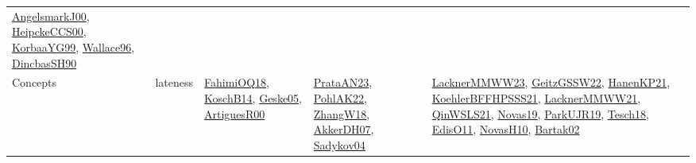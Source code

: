 {\begin{longtable}{lp{3cm}>{\raggedright}p{6cm}>{\raggedright}p{6cm}p{8cm}}
\href{papers/AngelsmarkJ00.pdf}{AngelsmarkJ00}\cite{AngelsmarkJ00}, \href{articles/HeipckeCCS00.pdf}{HeipckeCCS00}\cite{HeipckeCCS00}, \href{papers/KorbaaYG99.pdf}{KorbaaYG99}\cite{KorbaaYG99}, \href{articles/Wallace96.pdf}{Wallace96}\cite{Wallace96}, \href{articles/DincbasSH90.pdf}{DincbasSH90}\cite{DincbasSH90}\\
Concepts & lateness & \href{articles/FahimiOQ18.pdf}{FahimiOQ18}\cite{FahimiOQ18}, \href{papers/KoschB14.pdf}{KoschB14}\cite{KoschB14}, \href{papers/Geske05.pdf}{Geske05}\cite{Geske05}, \href{articles/ArtiguesR00.pdf}{ArtiguesR00}\cite{ArtiguesR00} & \href{articles/PrataAN23.pdf}{PrataAN23}\cite{PrataAN23}, \href{articles/PohlAK22.pdf}{PohlAK22}\cite{PohlAK22}, \href{articles/ZhangW18.pdf}{ZhangW18}\cite{ZhangW18}, \href{papers/AkkerDH07.pdf}{AkkerDH07}\cite{AkkerDH07}, \href{papers/Sadykov04.pdf}{Sadykov04}\cite{Sadykov04} & \href{articles/LacknerMMWW23.pdf}{LacknerMMWW23}\cite{LacknerMMWW23}, \href{papers/GeitzGSSW22.pdf}{GeitzGSSW22}\cite{GeitzGSSW22}, \href{papers/HanenKP21.pdf}{HanenKP21}\cite{HanenKP21}, \href{articles/KoehlerBFFHPSSS21.pdf}{KoehlerBFFHPSSS21}\cite{KoehlerBFFHPSSS21}, \href{papers/LacknerMMWW21.pdf}{LacknerMMWW21}\cite{LacknerMMWW21}, \href{articles/QinWSLS21.pdf}{QinWSLS21}\cite{QinWSLS21}, \href{articles/Novas19.pdf}{Novas19}\cite{Novas19}, \href{papers/ParkUJR19.pdf}{ParkUJR19}\cite{ParkUJR19}, \href{papers/Tesch18.pdf}{Tesch18}\cite{Tesch18}, \href{papers/EdisO11.pdf}{EdisO11}\cite{EdisO11}, \href{articles/NovasH10.pdf}{NovasH10}\cite{NovasH10}, \href{papers/Bartak02.pdf}{Bartak02}\cite{Bartak02}\\

\end{longtable}}
